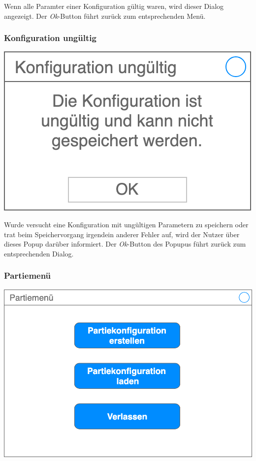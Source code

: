 \documentclass[a4paper,12pt,
headsepline,           %
oneside,               %
pointlessnumbers,      %
bibtotoc,              %
]{scrartcl}
\begin{document}
	Wenn alle Paramter einer Konfiguration gültig waren, wird dieser Dialog angezeigt. Der \textit{Ok}-Button führt zurück zum entsprechenden Menü.
	
	\subsubsection{Konfiguration ungültig}
	
	\includegraphics[scale=0.2]{images/konfiguration_ungueltig}
	
	Wurde versucht eine Konfiguration mit ungültigen Parametern zu speichern oder trat beim Speichervorgang irgendein anderer Fehler auf, wird der Nutzer über dieses Popup darüber informiert. Der \textit{Ok}-Button des Popupus führt zurück zum entsprechenden Dialog.
	
	\subsubsection{Partiemenü}
	
	\includegraphics[scale=0.2]{images/partiemenue}
	
\end{document}

